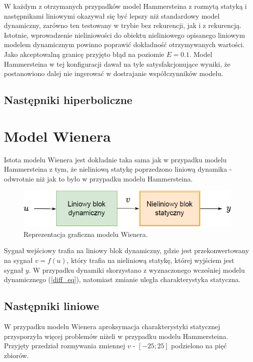 \documentclass[a4paper,titlepage,11pt,floatssmall]{mwrep}
\begin{document}
W każdym z otrzymanych przypadków model Hammersteina z rozmytą statyką i następnikami liniowymi okazywał się być lepszy niż standardowy model dynamiczny, zarówno ten testowany w trybie bez rekurencji, jak i z rekurencją. Istotnie, wprowadzenie nieliniowości do obiektu nieliniowego opisanego liniowym modelem dynamicznym powinno poprawić dokładność otrzymywanych wartości. Jako akceptowalną granicę przyjęto błąd na poziomie $E = \num{0.1}$. Model Hammersteina w tej konfiguracji dawał na tyle satysfakcjonujące wyniki, że postanowiono dalej nie ingerować w dostrajanie współczynników modelu. 

\newpage

\section{Następniki hiperboliczne}

\chapter{Model Wienera}
Istota modelu Wienera jest dokładnie taka sama jak w przypadku modelu Hammersteina z tym, że nieliniową statykę poprzedzono liniową dynamika - odwrotnie niż jak to było w przypadku modelu Hammersteina.

\begin{figure}[h!]
\centering
\includegraphics[width=\textwidth]{pictures/wien_model}
\caption{Reprezentacja graficzna modelu Wienera.}
\end{figure}

Sygnał wejściowy trafia na liniowy blok dynamiczny, gdzie jest przekonwertowany na sygnał $v = f(u)$, który trafia na nieliniową statykę, której wyjściem jest sygnał $y$. W przypadku dynamiki skorzystano z wyznaczonego wcześniej modelu dynamicznego (\ref{diff_eq}), natomiast zmianie uległa charakterystyka statyczna.

\section{Następniki liniowe}
W przypadku modelu Wienera aproksymacja charakterystyki statycznej przysporzyła więcej problemów niżeli w przypadku modelu Hammersteina. Przyjęty przedział rozmywania zmiennej $v$ - $[-25;25]$ podzielono na pięć zbiorów.
\end{document}
